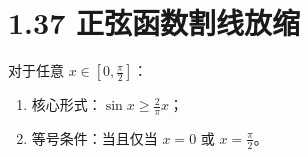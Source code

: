 \documentclass{article}
\begin{document}
\section*{1.37 正弦函数割线放缩}
对于任意 \( x \in [0,\frac{\pi}{2}] \)：
\begin{enumerate}
    \item 核心形式：\( \sin x \geq \frac{2}{\pi}x \)；
    \item 等号条件：当且仅当 \( x=0 \) 或 \( x=\frac{\pi}{2} \)。
\end{enumerate}
\end{document}
